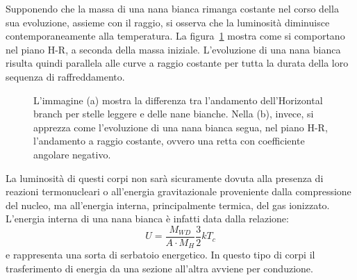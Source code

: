 Supponendo che la massa di una nana bianca rimanga costante nel corso della sua evoluzione, assieme con il raggio, si osserva che la luminosità diminuisce contemporaneamente alla temperatura. La figura~\ref{fig:WD} mostra come si comportano nel piano H-R, a seconda della massa iniziale. L'evoluzione di una nana bianca risulta quindi parallela alle curve a raggio costante per tutta la durata della loro sequenza di raffreddamento.
\begin{figure}
    \centering
     \qquad
    \caption{L'immagine (a) mostra la differenza tra l'andamento dell'Horizontal branch per stelle leggere e delle nane bianche. Nella (b), invece, si apprezza come l'evoluzione di una nana bianca segua, nel piano H-R, l'andamento a raggio costante, ovvero una retta con coefficiente angolare negativo.}\label{fig:WD}
\end{figure}

La luminosità di questi corpi non sarà sicuramente dovuta alla presenza di reazioni termonucleari o all'energia gravitazionale proveniente dalla compressione del nucleo, ma all'energia interna, principalmente termica, del gas ionizzato. L'energia interna di una nana bianca è infatti data dalla relazione: 
\[
    U = \frac{M_{WD}}{A \cdot M_{H}} \frac{3}{2} k T_c
\]
e rappresenta una sorta di serbatoio energetico. In questo tipo di corpi il trasferimento di energia da una sezione all'altra avviene per conduzione.

